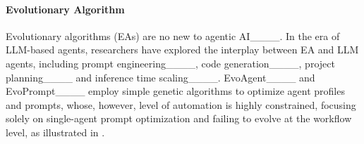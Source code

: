 \vspace{-1em}
\begin{table}[ht!]
\caption{Comparison among different automation techniques. }
\label{tab:intro_compare}
\scriptsize
\setlength\tabcolsep{0.8pt}

\vspace{-1.4em}
\end{table}

\vspace{-0.4em}
\paragraph{Evolutionary Algorithm}
Evolutionary algorithms (EAs) are no new to agentic AI____. In the era of LLM-based agents, researchers have explored the interplay between EA and LLM agents, including prompt engineering____, code generation____, project planning____ and inference time scaling____. EvoAgent____ and EvoPrompt____ employ simple genetic algorithms to optimize agent profiles and prompts, whose, however, level of automation is highly constrained, focusing solely on single-agent prompt optimization and failing to evolve at the workflow level, as illustrated in .

